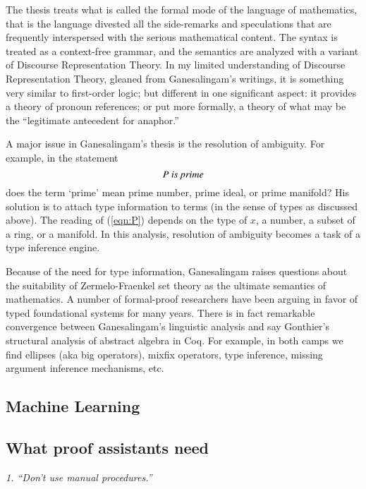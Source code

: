 \documentclass{llncs}
\begin{document}
The thesis treats what is called the formal mode of the language of
mathematics, that is the language divested all the side-remarks and
speculations that are frequently interspersed with the serious
mathematical content.  The syntax is treated as a context-free
grammar, and the semantics are analyzed with a variant of Discourse
Representation Theory.  In my limited understanding of Discourse
Representation Theory, gleaned from Ganesalingam's writings, it is
something very similar to first-order logic; but different in one
significant aspect: it provides a theory of pronoun references; or put
more formally, a theory of what may be the ``legitimate antecedent for
anaphor.''

A major issue in Ganesalingam's thesis is the resolution of ambiguity.
For example, in the statement
\begin{equation}\label{eqn:P}
P \text{\it ~is prime}
\end{equation}
does the term `prime' mean prime number, prime ideal, or prime
manifold?  His solution is to attach type information to terms (in the
sense of types as discussed above).  The reading of (\ref{eqn:P})
depends on the type of $x$, a number, a subset of a ring, or a
manifold.  In this analysis, resolution of ambiguity becomes a task of
a type inference engine.  

Because of the need for type information, Ganesalingam raises
questions about the suitability of Zermelo-Fraenkel set theory as the
ultimate semantics of mathematics.  A number of formal-proof
researchers have been arguing in favor of typed foundational systems
for many years.  There is in fact remarkable convergence between
Ganesalingam's linguistic analysis and say Gonthier's structural
analysis of abstract algebra in Coq. For example, in both camps we find
ellipses (aka  big operators), mixfix operators, type inference, missing
argument inference mechanisms, etc.


\subsection{Machine Learning}

\subsection{What proof assistants need}


\def\princ#1{\smallskip\hfill\break\smallskip\centerline{\it #1\hfill}}

\princ{1. ``Don't use manual procedures.''~\cite{XX}}
\end{document}

